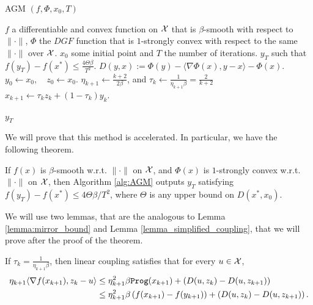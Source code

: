 \begin{algorithm}[H]\label{alg:AGM}
\scriptsize
\caption{AGM $(f, \Phi, x_0, T)$}
   \label{alg:AGM}
   \begin{algorithmic}[1]
   \REQUIRE $f$ a differentiable and convex function on $\mathcal{X}$ that is $\beta$-smooth with respect to $\|\cdot\|$, $\Phi$ the $DGF$ function that is $1$-strongly convex with respect to the same $\|\cdot\|$ over $\mathcal{X}$. $x_0$ some initial point and $T$ the number of iterations.
   \ENSURE $y_T$ such that $f(y_T) -f(x^\ast) \leq \frac{4\Theta \beta}{T^2}$.
   \STATE $D(y, x) := \Phi(y) - \langle \nabla \Phi(x), y-x\rangle - \Phi(x).$
   \STATE $y_0 \gets x_0, \quad z_0 \gets x_0$.
       \STATE $\eta_{k+1} \gets \frac{k+2}{2\beta}$, and $\tau_k \gets \frac{1}{\eta_{k+1}\beta} = \frac{2}{k+2}$
       \STATE $x_{k+1} \gets \tau_k z_k + (1-\tau_k)y_k$.

   \ENDFOR
    $y_T$
\end{algorithmic}
\end{algorithm}

We will prove that this method is accelerated. In particular, we have the following theorem.

\begin{theorem}\label{thm:linear_coupling}
    If $f(x)$ is $\beta$-smooth w.r.t. $\|\cdot\|$ on $\mathcal{X}$, and $\Phi(x)$ is $1$-strongly convex w.r.t. $\|\cdot\|$ on $\mathcal{X}$, then Algorithm \ref{alg:AGM} outputs $y_T$ satisfying $f(y_T) - f(x^\ast) \leq 4 \Theta \beta /T^2$, where $\Theta$ is any upper bound on $D(x^\ast, x_0)$.
\end{theorem}

We will use two lemmas, that are the analogous to Lemma \ref{lemma:mirror_bound} and Lemma \ref{lemma_simplified_coupling}, that we will prove after the proof of the theorem.

\begin{lemma}\label{lemma:mirror_bound_general}
    If $\tau_k = \frac{1}{\eta_{k+1}\beta}$, then linear coupling satisfies that for every $u \in \mathcal{X}$,
    \begin{align*}
        \begin{aligned}
            \eta_{k+1} \langle \nabla f(x_{k+1}), z_{k} - u \rangle &\leq \eta^2_{k+1}\beta {\tt{Prog}}(x_{k+1}) + \left( D(u, z_k) - D(u, z_{k+1})\right) \\
                                                                &\leq \eta_{k+1}^2\beta \left( f(x_{k+1}) - f(y_{k+1})\right) + \left( D(u, z_k) - D(u, z_{k+1})\right).
        \end{aligned}
    \end{align*}
\end{lemma}

